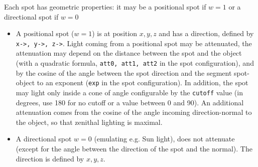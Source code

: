 \documentclass{article}
\begin{document}
Each spot has geometric properties: it may be a positional spot
if $w=1$ or a directional spot if $w=0$
\begin{itemize}
\item  A positional spot ($w=1$) is
at position $x,y,z$ and has a direction, defined by 
\verb|x->, y->, z->|. Light coming from a positional spot may
be attenuated, the attenuation may depend on the distance between
the spot and the object (with a quadratic formula, 
\verb|att0, att1, att2| in the spot configuration), and by the
cosine of the angle between the spot direction and the segment
spot-object to an exponent (\verb|exp| in the spot configuration).
In addition, the spot may light only inside a cone of angle
configurable by the \verb|cutoff| value (in degrees, use 180
for no cutoff or a value between 0 and 90). An additional attenuation
comes from the cosine of the angle incoming direction-normal to the
object, so that zenithal lighting is maximal.
\item A directional spot $w=0$ (emulating e.g. Sun light), does not
attenuate (except for the angle between the direction of the
spot and the normal). The direction is defined by $x,y,z$.
\end{itemize}
\end{document}
